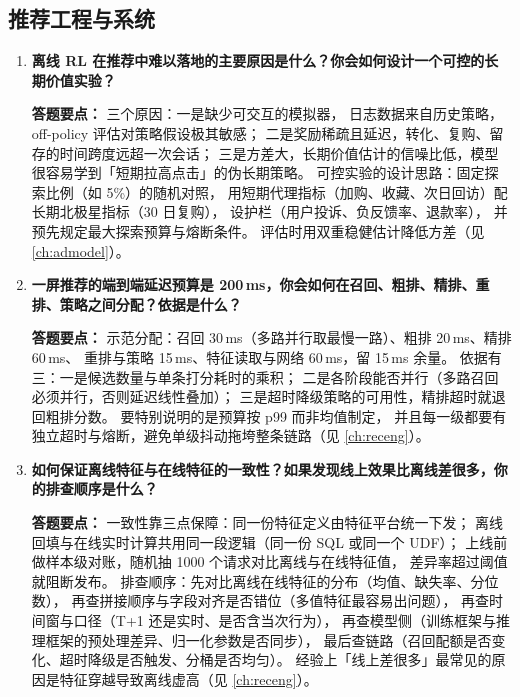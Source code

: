 \subsection{推荐工程与系统}

\begin{interview}[题库与答题要点]

\begin{enumerate}[label=]

  \item[\textcolor{VioletDeep}{\textbf{Q28.}}] \textbf{离线 RL 在推荐中难以落地的主要原因是什么？你会如何设计一个可控的长期价值实验？}
\par\smallskip\noindent\textcolor{VioletDeep}{\textbf{答题要点：}}
三个原因：一是缺少可交互的模拟器，
日志数据来自历史策略，off-policy 评估对策略假设极其敏感；
二是奖励稀疏且延迟，转化、复购、留存的时间跨度远超一次会话；
三是方差大，长期价值估计的信噪比低，模型很容易学到「短期拉高点击」的伪长期策略。
可控实验的设计思路：固定探索比例（如 5\%）的随机对照，
用短期代理指标（加购、收藏、次日回访）配长期北极星指标（30 日复购），
设护栏（用户投诉、负反馈率、退款率），
并预先规定最大探索预算与熔断条件。
评估时用双重稳健估计降低方差（见 \cref{ch:admodel}）。

  \item[\textcolor{VioletDeep}{\textbf{Q29.}}] \textbf{一屏推荐的端到端延迟预算是 200\,ms，你会如何在召回、粗排、精排、重排、策略之间分配？依据是什么？}
\par\smallskip\noindent\textcolor{VioletDeep}{\textbf{答题要点：}}
示范分配：召回 30\,ms（多路并行取最慢一路）、粗排 20\,ms、精排 60\,ms、
重排与策略 15\,ms、特征读取与网络 60\,ms，留 15\,ms 余量。
依据有三：一是候选数量与单条打分耗时的乘积；
二是各阶段能否并行（多路召回必须并行，否则延迟线性叠加）；
三是超时降级策略的可用性，精排超时就退回粗排分数。
要特别说明的是预算按 p99 而非均值制定，
并且每一级都要有独立超时与熔断，避免单级抖动拖垮整条链路（见 \cref{ch:receng}）。

  \item[\textcolor{VioletDeep}{\textbf{Q30.}}] \textbf{如何保证离线特征与在线特征的一致性？如果发现线上效果比离线差很多，你的排查顺序是什么？}
\par\smallskip\noindent\textcolor{VioletDeep}{\textbf{答题要点：}}
一致性靠三点保障：同一份特征定义由特征平台统一下发；
离线回填与在线实时计算共用同一段逻辑（同一份 SQL 或同一个 UDF）；
上线前做样本级对账，随机抽 1000 个请求对比离线与在线特征值，
差异率超过阈值就阻断发布。
排查顺序：先对比离线在线特征的分布（均值、缺失率、分位数），
再查拼接顺序与字段对齐是否错位（多值特征最容易出问题），
再查时间窗与口径（T+1 还是实时、是否含当次行为），
再查模型侧（训练框架与推理框架的预处理差异、归一化参数是否同步），
最后查链路（召回配额是否变化、超时降级是否触发、分桶是否均匀）。
经验上「线上差很多」最常见的原因是特征穿越导致离线虚高（见 \cref{ch:receng}）。


\end{enumerate}
\end{interview}
